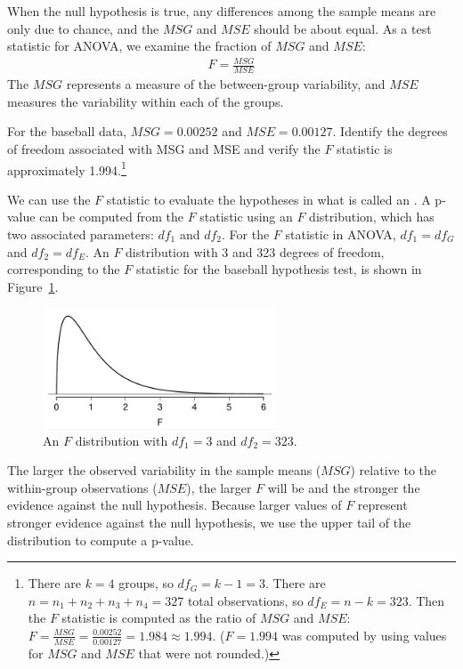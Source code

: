 When the null hypothesis is true, any differences among the sample means are only due to chance, and the $MSG$ and $MSE$ should be about equal. As a test statistic for ANOVA, we examine the fraction of $MSG$ and $MSE$:
\begin{align} \label{formulaForTheFStatistic}
F = \frac{MSG}{MSE}
\end{align}
The $MSG$ represents a measure of the between-group variability, and $MSE$ measures the variability within each of the groups.

\begin{exercise}
For the baseball data, $MSG = 0.00252$ and $MSE=0.00127$. Identify the degrees of freedom associated with MSG and MSE and verify the $F$ statistic is approximately 1.994.\footnote{There are $k=4$ groups, so $df_{G} = k-1 = 3$. There are $n = n_1 + n_2 + n_3 + n_4 = 327$ total observations, so $df_{E} = n - k = 323$. Then the $F$ statistic is computed as the ratio of $MSG$ and $MSE$: $F = \frac{MSG}{MSE} = \frac{0.00252}{0.00127} = 1.984 \approx 1.994$. ($F=1.994$ was computed by using values for $MSG$ and $MSE$ that were not rounded.)}
\end{exercise}

We can use the $F$ statistic to evaluate the hypotheses in what is called an . A p-value can be computed from the $F$ statistic using an $F$ distribution, which has two associated parameters: $df_{1}$ and $df_{2}$. For the $F$ statistic in ANOVA, $df_{1} = df_{G}$ and $df_{2}= df_{E}$. An $F$ distribution with 3 and 323 degrees of freedom, corresponding to the $F$ statistic for the baseball hypothesis test, is shown in Figure~\ref{fDist3And323}.

\begin{figure}[ht]
\centering
\includegraphics[width=0.62\textwidth]{ch_inference_for_means/figures/fDist3And323/fDist3And323}
\caption{An $F$ distribution with $df_1=3$ and $df_2=323$.}
\label{fDist3And323}
\end{figure}

The larger the observed variability in the sample means ($MSG$) relative to the within-group observations ($MSE$), the larger $F$ will be and the stronger the evidence against the null hypothesis. Because larger values of $F$ represent stronger evidence against the null hypothesis, we use the upper tail of the distribution to compute a p-value.

